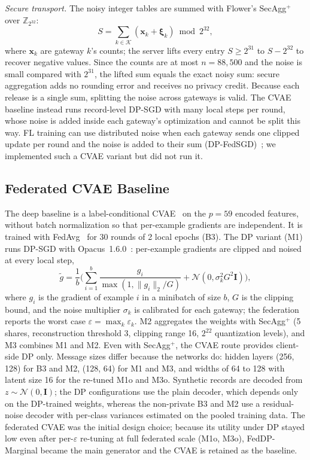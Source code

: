 \textit{Secure transport.} The noisy integer tables are summed with Flower's SecAgg$^+$~\cite{beutel2020, bell2020} over $\mathbb{Z}_{2^{32}}$:
\begin{equation}
S = \sum_{k \in \mathcal{K}} (\mathbf{x}_k + \boldsymbol{\xi}_k) \bmod 2^{32},
\label{eq:secagg}
\end{equation}
where $\mathbf{x}_k$ are gateway $k$'s counts; the server lifts every entry $S \ge 2^{31}$ to $S - 2^{32}$ to recover negative values. Since the counts are at most $n = 88{,}500$ and the noise is small compared with $2^{31}$, the lifted sum equals the exact noisy sum: secure aggregation adds no rounding error and receives no privacy credit. Because each release is a single sum, splitting the noise across gateways is valid. The CVAE baseline instead runs record-level DP-SGD with many local steps per round, whose noise is added inside each gateway's optimization and cannot be split this way. FL training can use distributed noise when each gateway sends one clipped update per round and the noise is added to their sum (DP-FedSGD)~\cite{kairouz2021, agarwal2021}; we implemented such a CVAE variant but did not run it.

\subsection{Federated CVAE Baseline}\label{subsec:cvae}
The deep baseline is a label-conditional CVAE~\cite{sohn2015cvae} on the $p = 59$ encoded features, without batch normalization so that per-example gradients are independent. It is trained with FedAvg~\cite{mcmahan2017} for 30 rounds of 2 local epochs (B3). The DP variant (M1) runs DP-SGD with Opacus~1.6.0~\cite{abadi2016dpsgd, yousefpour2021}: per-example gradients are clipped and noised at every local step,
\begin{equation}
\tilde{g} = \frac{1}{b} \Big( \sum_{i=1}^{b} \frac{g_i}{\max(1, \|g_i\|_2 / G)} + \mathcal{N}(0, \sigma_k^2 G^2 \mathbf{I}) \Big),
\label{eq:dpsgd}
\end{equation}
where $g_i$ is the gradient of example $i$ in a minibatch of size $b$, $G$ is the clipping bound, and the noise multiplier $\sigma_k$ is calibrated for each gateway; the federation reports the worst case $\varepsilon = \max_k \varepsilon_k$. M2 aggregates the weights with SecAgg$^+$ (5 shares, reconstruction threshold 3, clipping range 16, $2^{22}$ quantization levels), and M3 combines M1 and M2. Even with SecAgg$^+$, the CVAE route provides client-side DP only. Message sizes differ because the networks do: hidden layers (256, 128) for B3 and M2, (128, 64) for M1 and M3, and widths of 64 to 128 with latent size 16 for the re-tuned M1o and M3o. Synthetic records are decoded from $z \sim \mathcal{N}(0, \mathbf{I})$; the DP configurations use the plain decoder, which depends only on the DP-trained weights, whereas the non-private B3 and M2 use a residual-noise decoder with per-class variances estimated on the pooled training data. The federated CVAE was the initial design choice; because its utility under DP stayed low even after per-$\varepsilon$ re-tuning at full federated scale (M1o, M3o), FedDP-Marginal became the main generator and the CVAE is retained as the baseline.
